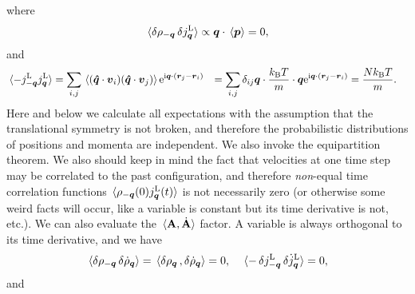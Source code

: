 \documentclass[hyperref, a4paper]{article}
\newcommand*{\ii}{\mathrm{i}}
\newcommand*{\ee}{\mathrm{e}}
\def\\{}%
\begin{document}
where 
\[
    \expval*{\var{\rho_{-\vb*{q}}} \var{{j}^\text{L}_{\vb*{q}}} } \propto \vb*{q} \cdot \expval*{\vb*{p}}  = 0,
\]
and 
\[
    \begin{aligned}
        \expval*{- j^\text{L}_{-\vb*{q}} j^\text{L}_{\vb*{q}}} &= 
        \sum_{i, j} \expval*{(\vu*{q} \cdot \vb*{v}_i) (\vu*{q} \cdot \vb*{v}_j)} \ee^{\ii \vb*{q} \cdot (\vb*{r}_j - \vb*{r}_i)} \\
        &= \sum_{i, j} \delta_{ij} \vb*{q} \cdot \frac{k_\text{B} T}{m}  \cdot  \vb*{q} \ee^{\ii \vb*{q} \cdot (\vb*{r}_j - \vb*{r}_i)} \\
        &= \frac{N k_\text{B} T}{m}.
    \end{aligned}
\]
Here and below we calculate all expectations with the assumption that the translational symmetry is not broken,
and therefore the probabilistic distributions of positions and momenta are independent. We also invoke the
equipartition theorem. We also should keep in mind the fact that velocities at one time step may be correlated to
the past configuration, and therefore \emph{non}-equal time correlation functions $\expval*{\rho_{-\vb*{q}}(0) j^\text{L}_{\vb*{q}}(t)}$ is not necessarily 
zero (or otherwise some weird facts will occur, like a variable is constant but its time derivative is not, etc.).
We can also evaluate the $\expval*{\vb{A}, \dot{\vb{A}}}$ factor. A variable is always 
orthogonal to its time derivative, and we have 
\[
    \expval*{\var{\rho_{-\vb*{q}}} \var{\dot{\rho}_{\vb*{q}}} } = \expval*{\var{\rho_{\vb*{q}}}, \var{\dot{\rho}_{\vb*{q}}} } = 0, \quad 
    \expval*{-\var{j^\text{L}_{-\vb*{q}}} \var{\dot{j}^\text{L}_{\vb*{q}}} } = 0,
\]
and 
\end{document}
